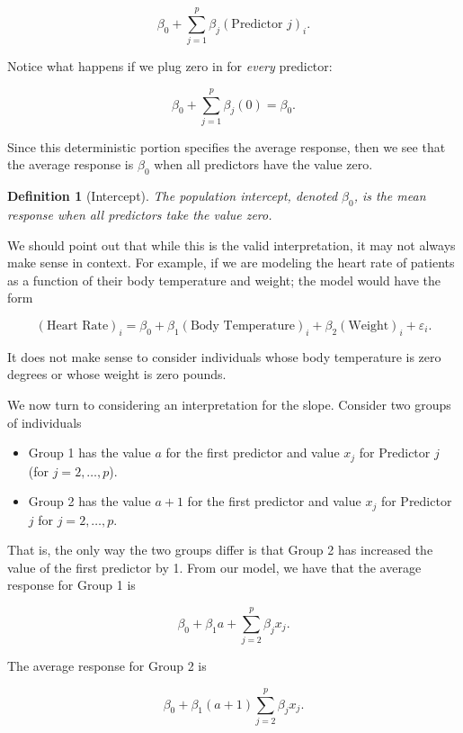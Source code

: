 \documentclass[
]{book}
\providecommand{\tightlist}{%
  \setlength{\itemsep}{0pt}\setlength{\parskip}{0pt}}
\theoremstyle{plain}
\theoremstyle{mydefn}
\newtheorem{definition}{Definition}[chapter]
\theoremstyle{myexmpl}
\theoremstyle{remark}
\begin{document}
\[\beta_0 + \sum_{j=1}^{p} \beta_j (\text{Predictor } j)_i.\]

Notice what happens if we plug zero in for \emph{every} predictor:

\[\beta_0 + \sum_{j=1}^{p} \beta_j (0) = \beta_0.\]

Since this deterministic portion specifies the average response, then we see that the average response is \(\beta_0\) when all predictors have the value zero.

\begin{definition}[Intercept]
\protect\hypertarget{def:defn-intercept}{}{\label{def:defn-intercept} {} }The population intercept, denoted \(\beta_0\), is the \emph{mean} response when all predictors take the value zero.\\
\end{definition}

We should point out that while this is the valid interpretation, it may not always make sense in context. For example, if we are modeling the heart rate of patients as a function of their body temperature and weight; the model would have the form

\[(\text{Heart Rate})_i = \beta_0 + \beta_1 (\text{Body Temperature})_i + \beta_2 (\text{Weight})_i + \varepsilon_i.\]

It does not make sense to consider individuals whose body temperature is zero degrees or whose weight is zero pounds.

We now turn to considering an interpretation for the slope. Consider two groups of individuals

\begin{itemize}
\tightlist
\item
  Group 1 has the value \(a\) for the first predictor and value \(x_j\) for Predictor \(j\) (for \(j = 2, \dotsc, p\)).
\item
  Group 2 has the value \(a + 1\) for the first predictor and value \(x_j\) for Predictor \(j\) for \(j = 2, \dotsc, p\).
\end{itemize}

That is, the only way the two groups differ is that Group 2 has increased the value of the first predictor by 1. From our model, we have that the average response for Group 1 is

\[\beta_0 + \beta_1 a + \sum_{j=2}^{p} \beta_j x_j.\]

The average response for Group 2 is

\[\beta_0 + \beta_1 (a + 1) \sum_{j=2}^{p} \beta_j x_j.\]
\end{document}
